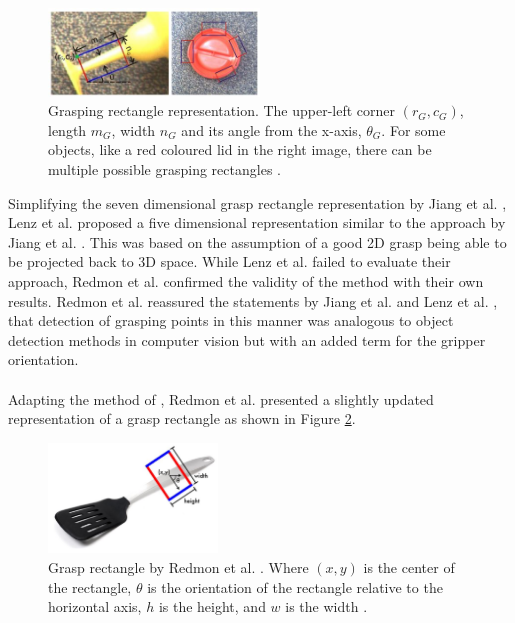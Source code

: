 \documentclass{vldb}
\begin{document}
\begin{figure}[!h]
	\centering
	\includegraphics[width=0.5\textwidth]{grasping-rectangle-jiang}
	\caption{Grasping rectangle representation. The upper-left corner $(r_G,c_G)$, length $m_G$, width $n_G$ and its angle from the x-axis, $\theta_G$. For some objects, like a red coloured lid in the right image, there can be multiple possible grasping rectangles \protect\cite{jiang}.}
	\label{fig:jiang-rectangle}
\end{figure}
Simplifying the seven dimensional grasp rectangle representation by Jiang et al. \cite{jiang}, Lenz et al. \cite{lenz} proposed a five dimensional representation similar to the approach by Jiang et al. \cite{jiang}. This was based on the assumption of a good 2D grasp being able to be projected back to 3D space. While Lenz et al. \cite{lenz} failed to evaluate their approach, Redmon et al. \cite{redmon} confirmed the validity of the method with their own results. Redmon et al. \cite{redmon} reassured the statements by Jiang et al. \cite{jiang} and Lenz et al. \cite{lenz}, that detection of grasping points in this manner was analogous to object detection methods in computer vision but with an added term for the gripper orientation.
\\ \\
Adapting the method of \cite{jiang,lenz}, Redmon et al. \cite{redmon} presented a slightly updated representation of a grasp rectangle as shown in Figure \ref{fig:redmon-rectangle}.
\begin{figure}[!h]
	\centering
	\includegraphics[width=0.4\textwidth]{redmon-rectangle}
	\caption{Grasp rectangle by Redmon et al. \protect\cite{redmon}. Where $(x, y)$ is the center of the rectangle, $\theta$ is the orientation of the rectangle relative to the horizontal axis, $h$ is the height, and $w$ is the width \protect\cite{redmon}.}
	\label{fig:redmon-rectangle}
\end{figure}
\end{document}
